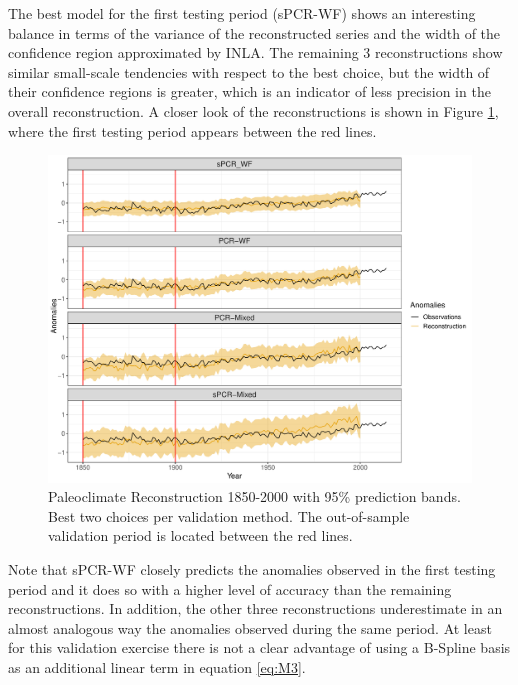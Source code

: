 \documentclass[12pt]{amsart}
\theoremstyle{plain}
\theoremstyle{definition}
\theoremstyle{remark}
\begin{document}
The best model for the first testing period (sPCR-WF) shows an interesting
balance in terms of the variance of the reconstructed series and the width of
the confidence region approximated by INLA. The remaining 3 reconstructions show similar small-scale tendencies with respect to the best choice, but the width of their confidence regions
is greater, which is an indicator of less precision in the overall
reconstruction. %
A closer look of the reconstructions is shown in Figure
\ref{fig:paleo19001}, where the first testing period appears between the red lines.
\begin{figure}
  \centering
  \includegraphics[scale=0.55]{Rec1900_Final}
  \caption{Paleoclimate Reconstruction 1850-2000 with 95\%
    prediction bands. Best two choices per validation method. The out-of-sample validation period is
    located between the red lines.}
  \label{fig:paleo19001}
\end{figure}
Note that sPCR-WF closely predicts the anomalies observed in the first testing
period and it does so with a higher level of accuracy than the remaining
reconstructions. In addition, the other three reconstructions underestimate in
an almost analogous way the anomalies observed during the same period. At least
for this validation exercise there is not a clear advantage of using a B-Spline
basis as an additional linear term in equation \eqref{eq:M3}.
\end{document}
